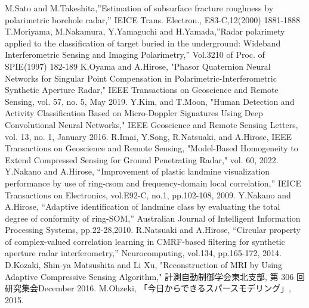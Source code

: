 \documentclass[12pt,a4paper]{jsreport}
\begin{document}
\begin{thebibliography}{99}
    M.Sato and M.Takeshita,”Estimation of subsurface fracture roughness by
    polarimetric borehole radar,” IEICE Trans. Electron., E83-C,12(2000) 1881-1888
    T.Moriyama, M.Nakamura, Y.Yamaguchi and H.Yamada,”Radar polarimety applied
    to the classification of target buried in the underground: Wideband Interferometric
    Sensing and Imaging Polarimetry,” Vol.3210 of Proc. of SPIE(1997) 182-189
     K.Oyama and A.Hirose, "Phasor Quaternion Neural Networks for Singular
     Point Compensation in Polarimetric-Interferometric
     Synthetic Aperture Radar," IEEE Transactions on Geoscience and Remote Sensing, vol. 57, no. 5, May 2019.
     Y.Kim, and T.Moon, "Human Detection and Activity Classification Based
     on Micro-Doppler Signatures Using Deep
     Convolutional Neural Networks," IEEE Geoscience and Remote Sensing Letters, vol. 13, no. 1, January 2016.
     R.Imai, Y.Song, R.Natsuaki, and A.Hirose, IEEE Transactions on Geoscience and Remote Sensing,
     "Model-Based Homogeneity to Extend Compressed Sensing for Ground Penetrating Radar," vol. 60, 2022.
     Y.Nakano and A.Hirose, “Improvement of plastic landmine visualization performance by use of ring-csom and frequency-domain local
     correlation,” IEICE Transactions on Electronics, vol.E92-C, no.1,
     pp.102-108, 2009.
     Y.Nakano and A.Hirose, “Adaptive identification of landmine class
     by evaluating the total degree of conformity of ring-SOM,” Australian
     Journal of Intelligent Information Processing Systems, pp.22-28,2010. %
    R.Natsuaki and A.Hirose, “Circular property of complex-valued
    correlation learning in CMRF-based filtering for synthetic aperture
    radar interferometry,” Neurocomputing, vol.134, pp.165-172, 2014.
    D.Kozaki, Shin-ya Matsushita and Li Xu, "Reconstruction of MRI by Using Adaptive Compressive Sensing
    Algorithm," 計測自動制御学会東北支部, 第 306 回研究集会December 2016.
    M.Ohzeki, 「今日からできるスパースモデリング」, 2015. 
   
    
     
   
    
     \end{thebibliography}
\end{document}
